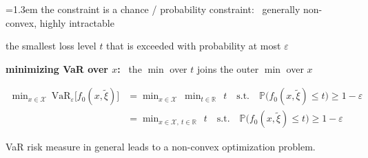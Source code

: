 \documentclass[10pt]{article}
\newenvironment{board}{%
  \par\vspace{4pt}
  \begingroup\leftskip=1.3em\relax\parskip=2pt\relax}{%
  \par\endgroup\vspace{4pt}}
\newcommand{\Prob}{\mathbb{P}}
\newcommand{\VaR}{\mathrm{VaR}}
\newcommand{\xit}{\tilde\xi}
\begin{document}
\begin{board}
\quad the constraint is a chance / probability constraint: \ generally non-convex, highly intractable
\vspace{3pt}

\quad the smallest loss level $t$ that is exceeded with probability at most $\varepsilon$
\vspace{6pt}

\begin{minipage}{\dimexpr\linewidth-1.3em\relax}
\quad \textbf{minimizing VaR over $x$:} \ the $\min$ over $t$ joins the outer $\min$ over $x$
\vspace{2pt}

\begin{center}
$\begin{aligned}
  \min_{x \in \mathcal{X}}\ \VaR_{\varepsilon}\big[f_0(x, \xit)\big]
  &= \min_{x \in \mathcal{X}}\ \min_{t \in \mathbb{R}}\ \ t \quad \text{s.t.} \quad \Prob\big(f_0(x, \xit) \le t\big) \ge 1 - \varepsilon \\
  &= \min_{x \in \mathcal{X},\ t \in \mathbb{R}}\ \ t \quad \text{s.t.} \quad \Prob\big(f_0(x, \xit) \le t\big) \ge 1 - \varepsilon
\end{aligned}$
\end{center}
\end{minipage}
\vspace{4pt}

\quad VaR risk measure in general leads to a non-convex optimization problem.
\end{board}
\end{document}

